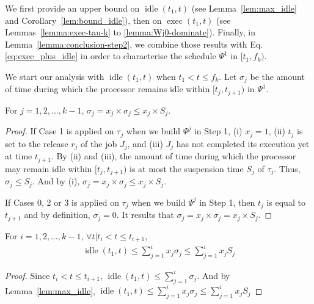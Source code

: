 We first provide an upper bound on $\operatorname{idle}(t_1, t)$ (see Lemma~\ref{lem:max_idle} and Corollary~\ref{lem:bound_idle}), then on $\operatorname{exec}(t_1, t)$ (see Lemmas~\ref{lemma:exec-tau-k} to \ref{lemma:Wj0-dominate}). Finally, in Lemma~\ref{lemma:conclusion-step2}, we combine those results with Eq. \eqref{eq:exec_plus_idle} in order to characterise the schedule $\Psi^1$ in $[t_1, f_k)$.

We start our analysis with $\operatorname{idle}(t_1, t)$ when $t_1 < t \leq f_k$.
Let $\sigma_j$ be the amount of time during which the processor remains idle within $[t_j, t_{j+1})$ in $\Psi^1$. 
\begin{Lemma}
\label{lem:max_idle}
For $j=1,2,\ldots,k-1$, $\sigma_j  = x_j \times \sigma_j \leq x_j \times S_j$. %
\end{Lemma}
\begin{proof}
If Case 1 is applied on $\tau_j$ when we build $\Psi^j$ in Step 1, (i) $x_j = 1$, (ii) $t_j$ is set to the release $r_j$ of the job $J_j$, and (iii) $J_j$ has not completed its execution yet at time $t_{j+1}$. By (ii) and (iii), the
  amount of time during which the processor may remain idle within
  $[t_j, t_{j+1})$ is at most the suspension time $S_j$ of $\tau_j$. Thus, $\sigma_j \leq S_j$. And by (i), $\sigma_j = x_j \times \sigma_j \leq x_j \times S_j$.
  
  If Cases 0, 2 or 3 is applied on $\tau_j$ when we build $\Psi^j$ in Step 1, then $t_j$ is equal to $t_{j+1}$ and by definition, $\sigma_j= 0$. It results that $\sigma_j= x_j \times \sigma_j = x_j \times S_j$.  
\end{proof}

\begin{Corollary}
\label{lem:bound_idle}
For $i=1,2,\ldots,k-1$, $\forall t | t_{i} < t \leq t_{i+1}$, 
\begin{align}
\label{eq:sumof-sigma}
\operatorname{idle}(t_1, t) \leq \sum_{j=1}^{i} x_j \sigma_j \leq
  \sum_{j=1}^{i} x_j S_j
\end{align}
\end{Corollary}
\begin{proof}
Since $t_{i} < t \leq t_{i+1}$, $\operatorname{idle}(t_1, t) \leq \sum_{j=1}^{i} \sigma_j$. And by Lemma~\ref{lem:max_idle}, $\operatorname{idle}(t_1, t) \leq \sum_{j=1}^{i} x_j \sigma_j \leq \sum_{j=1}^{i} x_j S_j$
\end{proof}

